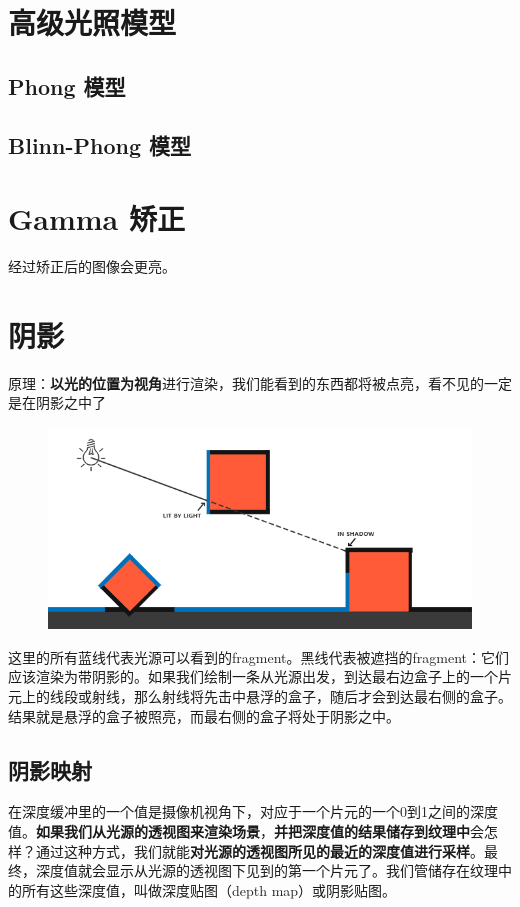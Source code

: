 \documentclass[UTF8,a4paper,12pt]{ctexbook}
\begin{document}
	
	\section{高级光照模型}
		\subsection{Phong 模型}
			
		
		\subsection{Blinn-Phong 模型}
			
		
	
	\section{Gamma 矫正}
		经过矫正后的图像会更亮。
	
	
	
	
	
	
	\section{阴影}
		原理：\textbf{以光的位置为视角}进行渲染，我们能看到的东西都将被点亮，看不见的一定是在阴影之中了
		
		\begin{figure}[H]
			\centering
			\includegraphics[width=.89\linewidth]{shadow_mapping_theory}
		\end{figure}
		
		这里的所有蓝线代表光源可以看到的fragment。黑线代表被遮挡的fragment：它们应该渲染为带阴影的。如果我们绘制一条从光源出发，到达最右边盒子上的一个片元上的线段或射线，那么射线将先击中悬浮的盒子，随后才会到达最右侧的盒子。结果就是悬浮的盒子被照亮，而最右侧的盒子将处于阴影之中。
		
		
		
		\subsection{阴影映射}
			在深度缓冲里的一个值是摄像机视角下，对应于一个片元的一个0到1之间的深度值。\textbf{如果我们从光源的透视图来渲染场景}，\textbf{并把深度值的结果储存到纹理中}会怎样？通过这种方式，我们就能\textbf{对光源的透视图所见的最近的深度值进行采样}。最终，深度值就会显示从光源的透视图下见到的第一个片元了。我们管储存在纹理中的所有这些深度值，叫做深度贴图（depth map）或阴影贴图。
		
\end{document}

